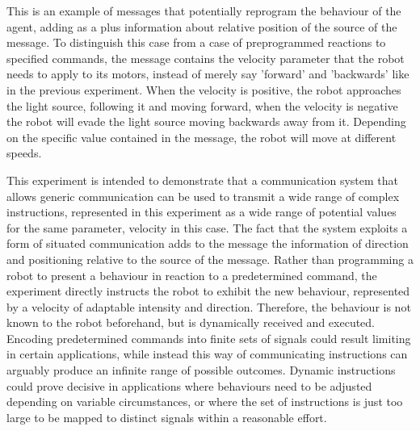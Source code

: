 This is an example of messages that potentially reprogram the behaviour of the agent, adding as a plus information about relative position of the source of the message.
To distinguish this case from a case of preprogrammed reactions to specified commands, the message contains the velocity parameter that the robot needs to apply to its motors, instead of merely say 'forward' and 'backwards' like in the previous experiment.
When the velocity is positive, the robot approaches the light source, following it and moving forward, when the velocity is negative the robot will evade the light source moving backwards away from it.
Depending on the specific value contained in the message, the robot will move at different speeds.

This experiment is intended to demonstrate that a communication system that allows generic communication can be used to transmit a wide range of complex instructions, represented in this experiment as a wide range of potential values for the same parameter, velocity in this case.
The fact that the system exploits a form of situated communication adds to the message the information of direction and positioning relative to the source of the message.
Rather than programming a robot to present a behaviour in reaction to a predetermined command, the experiment directly instructs the robot to exhibit the new behaviour, represented by a velocity of adaptable intensity and direction.
Therefore, the behaviour is not known to the robot beforehand, but is dynamically received and executed.
Encoding predetermined commands into finite sets of signals could result limiting in certain applications, while instead this way of communicating instructions can arguably produce an infinite range of possible outcomes.
Dynamic instructions could prove decisive in applications where behaviours need to be adjusted depending on variable circumstances, or where the set of instructions is just too large to be mapped to distinct signals within a reasonable effort.
%

